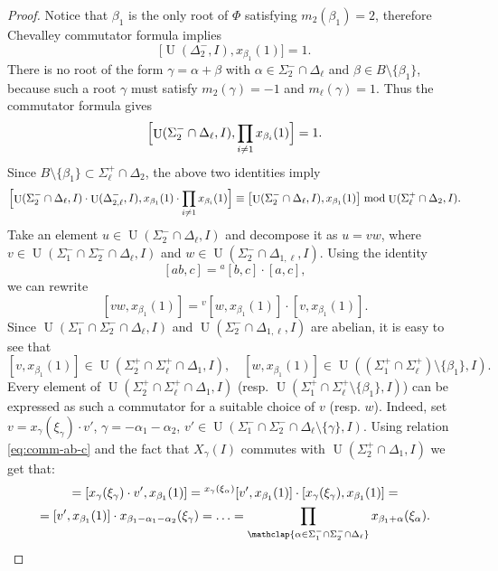 \documentclass[11pt]{amsart}
\theoremstyle{plain}
\numberwithin{equation}{section}
\numberwithin{lemma}{section}
\theoremstyle{definition}
\theoremstyle{remark}
\DeclareMathOperator{\U}{U}
\begin{document}
\begin{proof}
Notice that $\beta_1$ is the only root of $\Phi$ satisfying $m_2(\beta_1)=2$, therefore Chevalley commutator formula implies
\[ \bigl[\U(\Delta_2^-, I), x_{\beta_1}(1)\bigr]=1. \]
There is no root of the form $\gamma=\alpha+\beta$ with $\alpha\in\Sigma_2^-\cap\Delta_\ell$ and $\beta\in B\setminus\{\beta_1\}$, because such a root $\gamma$ must satisfy $m_2(\gamma)=-1$ and $m_\ell(\gamma)=1$. Thus the commutator formula gives
\[\Bigl[\U(\Sigma_2^-\cap\Delta_\ell, I), \prod_{i\neq1}x_{\beta_i}(1)\Bigr]=1. \]
Since $B\setminus\{\beta_1\}\subset\Sigma_\ell^+\cap\Delta_2$, the above two identities imply
\[
\Bigl[ \U(\Sigma_2^-\cap\Delta_\ell, I)\cdot\U(\Delta_{2, \ell}^-, I), x_{\beta_1}(1)\cdot\prod_{i\neq1}x_{\beta_i}(1) \Bigr]
\equiv \bigl[ \U(\Sigma_2^-\cap\Delta_\ell, I), x_{\beta_1}(1) \bigr] \bmod \U(\Sigma_\ell^+\cap\Delta_2, I).
\]
Take an element $u\in\U(\Sigma_2^-\cap\Delta_\ell, I)$ and decompose it as $u=vw$, where $v\in\U(\Sigma_1^-\cap\Sigma_2^-\cap\Delta_\ell, I)$ and $w\in\U(\Sigma_2^-\cap\Delta_{1, \ell}, I)$.
Using the identity
\begin{equation}\label{eq:comm-ab-c}
[ab, c]={}^a[b, c]\cdot[a, c], 
\end{equation}
we can rewrite
\[ [vw, x_{\beta_1}(1)] = {}^v[w, x_{\beta_1}(1)]\cdot[v, x_{\beta_1}(1)].  \]
Since $\U(\Sigma_1^-\cap\Sigma_2^-\cap\Delta_\ell, I)$ and $\U(\Sigma_2^-\cap\Delta_{1, \ell}, I)$ are abelian, it is easy to see that
\[ [v, x_{\beta_1}(1)]\in\U(\Sigma_2^+\cap\Sigma_\ell^+\cap\Delta_1, I), \quad [w, x_{\beta_1}(1)]\in\U((\Sigma_1^+\cap\Sigma_\ell^+)\setminus\{\beta_1\}, I). \]
Every element of $\U(\Sigma_2^+\cap\Sigma_\ell^+\cap\Delta_1, I)$ (resp. $\U(\Sigma_1^+\cap\Sigma_\ell^+\setminus\{\beta_1\}, I)$) can be expressed as such a commutator for a suitable choice of $v$ (resp. $w$).
Indeed, set $v=x_\gamma(\xi_\gamma)\cdot v'$, $\gamma=-\alpha_1-\alpha_2$, $v' \in \U(\Sigma_1^- \cap \Sigma_2^- \cap \Delta_\ell \setminus \{\gamma\}, I)$.
Using relation \eqref{eq:comm-ab-c} and the fact that $X_\gamma(I)$ commutes with $\U(\Sigma_2^+\cap\Delta_1, I)$ we get that:
\begin{multline*}
[v, x_{\beta_1}(1)] = [x_\gamma(\xi_\gamma)\cdot v', x_{\beta_1}(1)] = {}^{x_\gamma(\xi_\alpha)}[v', x_{\beta_1}(1)] \cdot [x_\gamma(\xi_\gamma), x_{\beta_1}(1)] = \\
= [v', x_{\beta_1}(1)]\cdot x_{\beta_1-\alpha_1-\alpha_2}(\xi_\gamma) = \ldots = \prod_{\mathclap{\alpha\in\Sigma_1^- \cap \Sigma_2^- \cap \Delta_\ell}} x_{\beta_1+\alpha}(\xi_\alpha).
 \end{multline*}

\end{proof}
\end{document}
